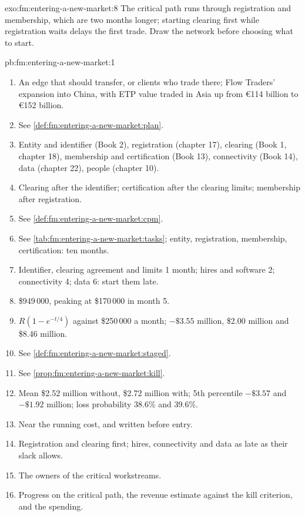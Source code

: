 \begin{solution}{exo:fm:entering-a-new-market:8}
The critical path runs through registration and membership, which are two months longer; starting clearing first while registration waits delays
the first trade. Draw the network before choosing what to start.
\end{solution}

\begin{solution}{pb:fm:entering-a-new-market:1}
\begin{enumerate}
\item An edge that should transfer, or clients who trade there; Flow Traders' expansion into China, with ETP value traded in Asia up from
\euro114 billion to \euro152 billion.
\item See \cref{def:fm:entering-a-new-market:plan}.
\item Entity and identifier (Book 2), registration (chapter 17), clearing (Book 1, chapter 18), membership and certification (Book 13),
connectivity (Book 14), data (chapter 22), people (chapter 10).
\item Clearing after the identifier; certification after the clearing limits; membership after registration.
\item See \cref{def:fm:entering-a-new-market:cpm}.
\item See \cref{tab:fm:entering-a-new-market:tasks}; entity, registration, membership, certification: ten months.
\item Identifier, clearing agreement and limits 1 month; hires and software 2; connectivity 4; data 6: start them late.
\item \$949\,000, peaking at \$170\,000 in month 5.
\item $R(1-e^{-t/4})$ against \$250\,000 a month; $-\$3.55$ million, \$2.00 million and \$8.46 million.
\item See \cref{def:fm:entering-a-new-market:staged}.
\item See \cref{prop:fm:entering-a-new-market:kill}.
\item Mean \$2.52 million without, \$2.72 million with; 5th percentile $-\$3.57$ and $-\$1.92$ million; loss probability 38.6\% and 39.6\%.
\item Near the running cost, and written before entry.
\item Registration and clearing first; hires, connectivity and data as late as their slack allows.
\item The owners of the critical workstreams.
\item Progress on the critical path, the revenue estimate against the kill criterion, and the spending.

\end{enumerate}
\end{solution}
